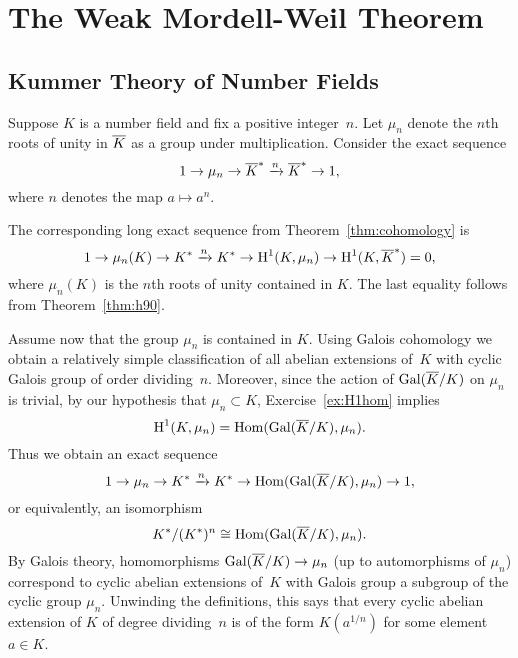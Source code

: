 \chapter{The Weak Mordell-Weil Theorem}\label{ch:weakmw}

\section{Kummer Theory of Number Fields}\label{sec:kummernf}

Suppose $K$ is a number field and fix a positive integer~$n$.
Let $\mu_n$ denote the $n$th roots of unity in $\overline{K}$ as a group
under multiplication. Consider the exact sequence
$$
	1 \to \mu_n \to \overline{K}^* \xrightarrow{n} \overline{K}^* \to 1,
$$
where $n$ denotes the map $a\mapsto a^n$.

The corresponding long exact sequence from Theorem~\ref{thm:cohomology}
is
$$
	1 \to \mu_n(K) \to K^* \xrightarrow{n} K^*
	\to \operatorname{H}^1(K,\mu_n) \to \operatorname{H}^1(K,\overline{K}^*) =0,
$$
where $\mu_n(K)$ is the $n$th roots of unity contained in $K$.
The last equality follows from Theorem~\ref{thm:h90}.

Assume now that the group $\mu_n$ is contained in $K$.
Using Galois cohomology we obtain a relatively simple classification
of all abelian extensions of~$K$ with cyclic Galois group of order
dividing~$n$. Moreover, since the action of $\operatorname{Gal}(\overline{K}/K)$ on
$\mu_n$ is trivial, by our hypothesis that $\mu_n\subset K$,
Exercise~\ref{ex:H1hom} implies
$$
	\operatorname{H}^1(K,\mu_n) = \operatorname{Hom}(\operatorname{Gal}(\overline{K}/K),\mu_n).
$$
Thus we obtain an exact sequence
$$
	1 \to \mu_n \to K^* \xrightarrow{n} K^*
	\to \operatorname{Hom}(\operatorname{Gal}(\overline{K}/K),\mu_n) \to 1,
$$
or equivalently, an isomorphism
$$
	K^*/(K^*)^n \cong \operatorname{Hom}(\operatorname{Gal}(\overline{K}/K),\mu_n).
$$
By Galois theory, homomorphisms $\operatorname{Gal}(\overline{K}/K)\to \mu_n$ (up to
automorphisms of $\mu_n$) correspond to cyclic abelian extensions
of~$K$ with Galois group a subgroup of the cyclic group $\mu_n$.
Unwinding the definitions, this says that every
cyclic abelian extension of $K$ of degree dividing~$n$ is of the form
$K(a^{1/n})$ for some element $a\in K$.

